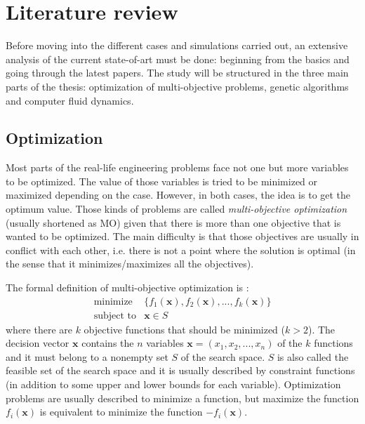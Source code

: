 \chapter{Literature review}
    
    Before moving into the different cases and simulations carried out, an extensive analysis of the current state-of-art must be done: beginning from the basics and going through the latest papers. The study will be structured in the three main parts of the thesis: optimization of multi-objective problems, genetic algorithms and computer fluid dynamics.

\section{Optimization}

    Most parts of the real-life engineering problems face not one but more variables to be optimized. The value of those variables is tried to be minimized or maximized depending on the case. However, in both cases, the idea is to get the optimum value. Those kinds of problems are called \textit{multi-objective optimization} (usually shortened as MO) given that there is more than one objective that is wanted to be optimized. The main difficulty is that those objectives are usually in conflict with each other, i.e. there is not a point where the solution is optimal (in the sense that it minimizes/maximizes all the objectives).
    
    The formal definition of multi-objective optimization is \cite{nonlinear}:
    \begin{equation}
        \begin{array}{cl}
            \textrm{minimize} & \{f_1(\bm{x}),f_2(\bm{x}),...,f_k(\bm{x})\} \\
            \textrm{subject to} & \bm{x} \in S
        \end{array}
        \label{eq:multiobjectiveDefnition}
    \end{equation}
    where there are $k$ objective functions that should be minimized ($k > 2$). The decision vector $\bm{x}$ contains the $n$ variables $\bm{x}=(x_1,x_2,...,x_n)$ of the $k$ functions and it must belong to a nonempty set $S$ of the search space. $S$ is also called the feasible set of the search space and it is usually described by constraint functions (in addition to some upper and lower bounds for each variable). Optimization problems are usually described to minimize a function, but maximize the function $f_i(\bm{x})$ is equivalent to minimize the function $-f_i(\bm{x})$.
    
